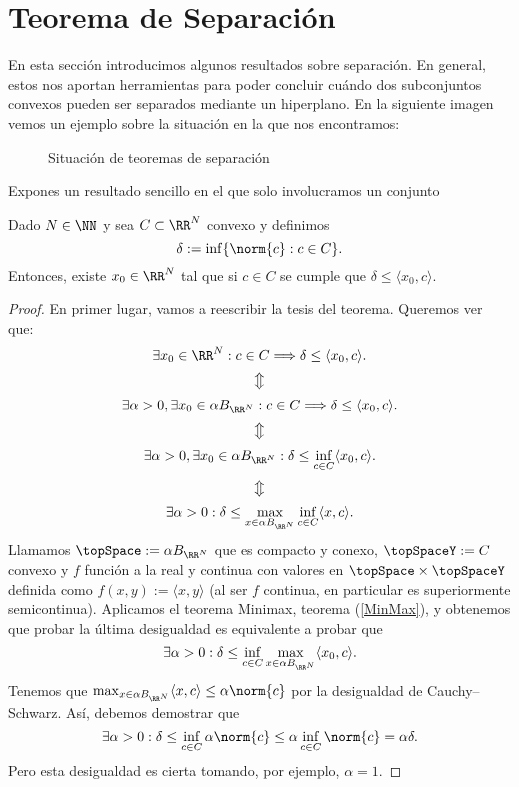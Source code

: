 \chapter{Teorema de Separación}

En esta sección introducimos algunos resultados sobre separación. En general, estos nos aportan herramientas para poder concluir cuándo dos subconjuntos convexos pueden ser separados mediante un hiperplano. En la siguiente imagen vemos un ejemplo sobre la situación en la que nos encontramos:

\begin{figure}[h!]
\begin{center}
\end{center}
\caption{Situación de teoremas de separación}
\end{figure}

Expones un resultado sencillo en el que solo involucramos un conjunto

\begin{teoremaBox}\label{sep1}
Dado $ N \in \NN $ y sea $ C \subset \RR^N $ convexo y definimos
\[
\delta := \inf\{ \norm{c}: c \in C \}.
\]
Entonces, existe $ x_0 \in \RR^N $ tal que si $ c \in C $ se cumple que $ \delta \leq \langle x_0,c\rangle $.
\end{teoremaBox}
\begin{proof}
En primer lugar, vamos a reescribir la tesis del teorema. Queremos ver que:
\[
\exists x_0 \in \RR^N : c \in C \Longrightarrow \delta \leq \langle x_0,c\rangle.
\]
\[
\big\Updownarrow
\]
\[
\exists \alpha > 0, \exists x_0 \in \alpha B_{\RR^N} : c \in C \Longrightarrow \delta \leq \langle x_0,c\rangle.
\]
\[
\big\Updownarrow
\]
\[
\exists \alpha > 0, \exists x_0 \in \alpha B_{\RR^N} : \delta \leq \inf_{c\in C}\langle x_0,c\rangle.
\]
\[
\big\Updownarrow
\]
\[
\exists \alpha > 0 : \delta \leq \max_{x\in \alpha B_{\RR^N}}\inf_{c\in C}\langle x,c\rangle.
\]
Llamamos $ \topSpace := \alpha B_{\RR^N}$ que es compacto y conexo, $ \topSpaceY:= C$ convexo y $ f $ función a la real y continua con valores en $ \topSpace \times \topSpaceY $ definida como $ f(x,y):=\langle x,y \rangle $ (al ser $ f $ continua, en particular es superiormente semicontinua). Aplicamos el teorema Minimax, teorema (\ref{MinMax}), y obtenemos que probar la última desigualdad es equivalente a probar que
\[
\exists \alpha > 0 : \delta \leq \inf_{c\in C}\max_{x\in \alpha B_{\RR^N}}\langle x_0,c\rangle.
\]
Tenemos que $ \max_{x\in \alpha B_{\RR^N}}\langle x,c\rangle \leq \alpha \norm{c} $ por la desigualdad de Cauchy–Schwarz. Así, debemos demostrar que
\[
\exists \alpha > 0 : \delta \leq \inf_{c\in C} \alpha \norm{c} \leq \alpha  \inf_{c\in C}\norm{c} = \alpha \delta.
\]
Pero esta desigualdad es cierta tomando, por ejemplo, $ \alpha = 1 $.
\end{proof}


